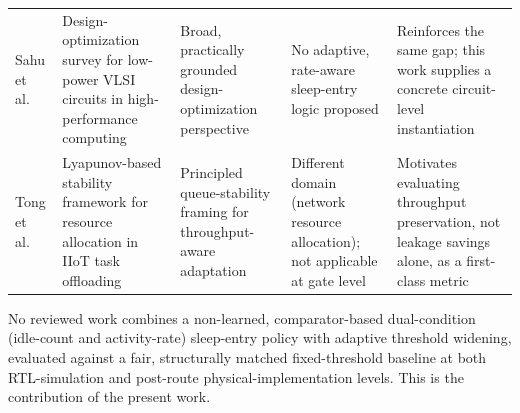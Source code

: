 \begin{table}[t]
\begin{tabular}{@{}p{2.3cm} p{3.3cm} p{3.6cm} p{3.6cm} p{3.9cm}@{}}
Sahu et al.\ \cite{sahu2025} &
Design-optimization survey for low-power VLSI circuits in high-performance computing &
Broad, practically grounded design-optimization perspective &
No adaptive, rate-aware sleep-entry logic proposed &
Reinforces the same gap; this work supplies a concrete circuit-level instantiation \\
\addlinespace
Tong et al.\ \cite{tong2024} &
Lyapunov-based stability framework for resource allocation in IIoT task offloading &
Principled queue-stability framing for throughput-aware adaptation &
Different domain (network resource allocation); not applicable at gate level &
Motivates evaluating throughput preservation, not leakage savings alone, as a first-class metric \\
\bottomrule
\end{tabular}
\end{table}

No reviewed work combines a non-learned, comparator-based dual-condition (idle-count and activity-rate) sleep-entry policy with adaptive threshold widening, evaluated against a fair, structurally matched fixed-threshold baseline at both RTL-simulation and post-route physical-implementation levels. This is the contribution of the present work.